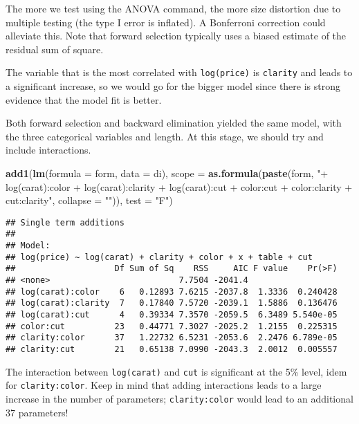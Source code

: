 \documentclass[]{book}
\newenvironment{Shaded}{\begin{snugshade}}{\end{snugshade}}
\newcommand{\DataTypeTok}[1]{\textcolor[rgb]{0.13,0.29,0.53}{#1}}
\newcommand{\KeywordTok}[1]{\textcolor[rgb]{0.13,0.29,0.53}{\textbf{#1}}}
\newcommand{\NormalTok}[1]{#1}
\newcommand{\StringTok}[1]{\textcolor[rgb]{0.31,0.60,0.02}{#1}}
\theoremstyle{definition}
\theoremstyle{definition}
\theoremstyle{definition}
\theoremstyle{remark}
\begin{document}
The more we test using the ANOVA command, the more size distortion due
to multiple testing (the type I error is inflated). A Bonferroni
correction could alleviate this. Note that forward selection typically
uses a biased estimate of the residual sum of square.

The variable that is the most correlated with \texttt{log(price)} is
\texttt{clarity} and leads to a significant increase, so we would go for
the bigger model since there is strong evidence that the model fit is
better.

Both forward selection and backward elimination yielded the same model,
with the three categorical variables and length. At this stage, we
should try and include interactions.

\begin{Shaded}
\begin{Highlighting}[]
\KeywordTok{add1}\NormalTok{(}\KeywordTok{lm}\NormalTok{(}\DataTypeTok{formula =}\NormalTok{ form, }\DataTypeTok{data =}\NormalTok{ di),}
        \DataTypeTok{scope =}  \KeywordTok{as.formula}\NormalTok{(}\KeywordTok{paste}\NormalTok{(form, }\StringTok{"+ log(carat):color + log(carat):clarity + }
\StringTok{                                  log(carat):cut + color:cut + color:clarity + cut:clarity"}\NormalTok{, }\DataTypeTok{collapse =} \StringTok{""}\NormalTok{)),}
     \DataTypeTok{test =} \StringTok{"F"}\NormalTok{)}
\end{Highlighting}
\end{Shaded}

\begin{verbatim}
## Single term additions
## 
## Model:
## log(price) ~ log(carat) + clarity + color + x + table + cut
##                    Df Sum of Sq    RSS     AIC F value    Pr(>F)
## <none>                          7.7504 -2041.4                  
## log(carat):color    6   0.12893 7.6215 -2037.8  1.3336  0.240428
## log(carat):clarity  7   0.17840 7.5720 -2039.1  1.5886  0.136476
## log(carat):cut      4   0.39334 7.3570 -2059.5  6.3489 5.540e-05
## color:cut          23   0.44771 7.3027 -2025.2  1.2155  0.225315
## clarity:color      37   1.22732 6.5231 -2053.6  2.2476 6.789e-05
## clarity:cut        21   0.65138 7.0990 -2043.3  2.0012  0.005557
\end{verbatim}

The interaction between \texttt{log(carat)} and \texttt{cut} is
significant at the 5\% level, idem for \texttt{clarity:color}. Keep in
mind that adding interactions leads to a large increase in the number of
parameters; \texttt{clarity:color} would lead to an additional 37
parameters!
\end{document}
